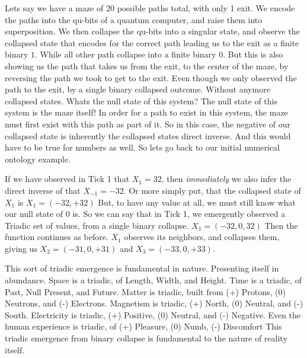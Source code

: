 \documentclass[11pt]{article}
\begin{document}
        Lets say we have a maze of 20 possible paths total, with only 1 exit.
        We encode the paths into the qu-bits of a quantum computer, and raise them into superposition.
        We then collapse the qu-bits into a singular state, and observe the collapsed state that encodes for the correct path leading us to the exit as a finite binary $1$.
        While all other path collapse into a finite binary $0$.
        But this is also showing us the path that takes us from the exit, to the center of the maze, by reversing the path we took to get to the exit.
        Even though we only observed the path to the exit, by a single binary collapsed outcome. Without anymore collapsed states.
        Whats the null state of this system?
        The null state of this system is the maze itself!
        In order for a path to exist in this system, the maze must first exist with this path as part of it.
        So in this case, the negative of our collapsed state is inherently the collapsed states direct inverse.
        And this would have to be true for numbers as well.
        So lets go back to our initial numerical ontology example.

        If we have observed in Tick 1 that $X_1 = 32$, then \emph{immediately} we also infer the direct inverse of that $X_{-1} = -32$.
        Or more simply put, that the collapsed state of $X_1$ is $X_1 = (-32, +32)$
        But, to have any value at all, we must still know what our null state of $0$ is.
        So we can say that in Tick 1, we emergently observed a Triadic set of values, from a single binary collapse.
        $X_1 = (-32, 0, 32)$ Then the function continues as before.
        $X_1$ observes its neighbors, and collapses them, giving us $X_2 = (-31, 0, +31)$ and $X_3 = (-33, 0, +33)$.

        This sort of triadic emergence is fundamental in nature.
        Presenting itself in abundance.
        Space is a triadic, of Length, Width, and Height.
        Time is a triadic, of Past, Null Present, and Future.
        Matter is triadic, built from (+) Protons, (0) Neutrons, and (-) Electrons.
        Magnetism is triadic, (+) North, (0) Neutral, and (-) South.
        Electricity is triadic, (+) Positive, (0) Neutral, and (-) Negative.
        Even the human experience is triadic, of (+) Pleasure, (0) Numb, (-) Discomfort
        This triadic emergence from binary collapse is fundamental to the nature of reality itself.
\end{document}
